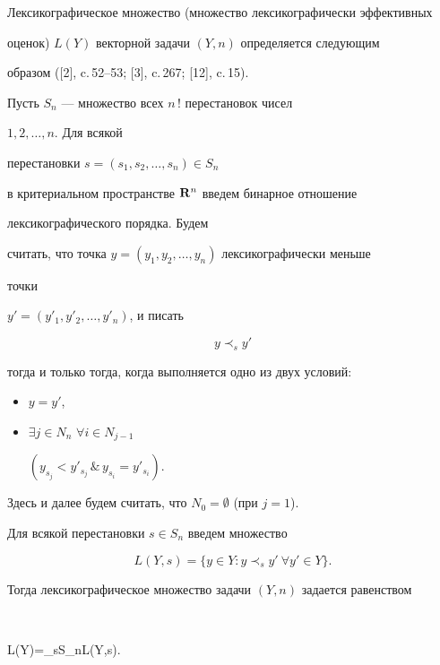  


Лексикографическое множество (множество лексикографически эффективных 


оценок) $L(Y)$ векторной задачи $(Y,n)$ определяется следующим 


образом ([2], c.\,52--53; [3], c.\,267; [12], c.\,15). 


 


Пусть $S_n$ --- множество всех $n\,!$ перестановок чисел 


$1,2,\dotsc,n$. Для всякой 


перестановки $s=(s_1,s_2,\dotsc,s_n)\in S_n$ 


в критериальном пространстве $\bold R^n$ введем бинарное отношение 


лексикографического порядка. Будем 


считать, что точка $y=(y_1,y_2,\dotsc,y_n)$ лексикографически меньше 


точки 


$y'=(y'_1,y'_2,\dotsc,y'_n)$, и писать 


$$ 


y\prec_s y' 


$$ 


тогда и только тогда, когда выполняется одно из двух условий: 


\begin{itemize} 


\item[1.] $y=y'$, 


\item[2.] $\exists j\in N_n$ $\forall i\in N_{j-1}$ 


$(y_{s_j}<y'_{s_j}\,\&\,y_{s_i}=y'_{s_i})$. 


\end{itemize} 


Здесь и далее будем считать, что $N_0=\emptyset$ (при $j=1$). 


 


Для всякой перестановки $s\in S_n$ введем множество 


$$ 


L(Y,s)=\{y\in Y:y\prec_s y'\ \forall y'\in Y\}. 


$$ 


Тогда лексикографическое множество задачи $(Y,n)$ задается равенством 


$$ 


L(Y)=\bigcup_{s\in S_n}L(Y,s). 


